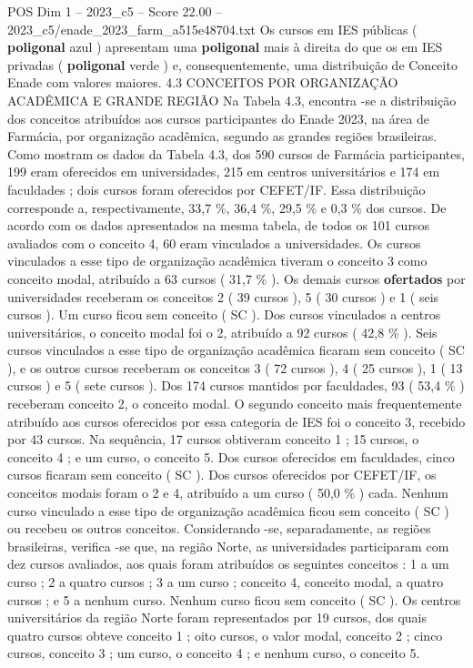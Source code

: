 \begin{textsample}{POS Dim 1 – 2023\_c5 – Score 22.00 – 2023\_c5/enade\_2023\_farm\_a515e48704.txt}
Os cursos em IES públicas ( \textbf{poligonal} azul ) apresentam uma \textbf{poligonal} mais à direita do que os em IES privadas ( \textbf{poligonal} verde ) e, consequentemente, uma distribuição de Conceito Enade com valores maiores. 4.3 CONCEITOS POR ORGANIZAÇÃO ACADÊMICA E GRANDE REGIÃO Na Tabela 4.3, encontra -se a distribuição dos conceitos atribuídos aos cursos participantes do Enade 2023, na área de Farmácia, por organização acadêmica, segundo as grandes regiões brasileiras.
Como mostram os dados da Tabela 4.3, dos 590 cursos de Farmácia participantes, 199 eram oferecidos em universidades, 215 em centros universitários e 174 em faculdades ; dois cursos foram oferecidos por CEFET/IF.
Essa distribuição corresponde a, respectivamente, 33,7 \%, 36,4 \%, 29,5 \% e 0,3 \% dos cursos.
De acordo com os dados apresentados na mesma tabela, de todos os 101 cursos avaliados com o conceito 4, 60 eram vinculados a universidades.
Os cursos vinculados a esse tipo de organização acadêmica tiveram o conceito 3 como conceito modal, atribuído a 63 cursos ( 31,7 \% ).
Os demais cursos \textbf{ofertados} por universidades receberam os conceitos 2 ( 39 cursos ), 5 ( 30 cursos ) e 1 ( seis cursos ).
Um curso ficou sem conceito ( SC ).
Dos cursos vinculados a centros universitários, o conceito modal foi o 2, atribuído a 92 cursos ( 42,8 \% ).
Seis cursos vinculados a esse tipo de organização acadêmica ficaram sem conceito ( SC ), e os outros cursos receberam os conceitos 3 ( 72 cursos ), 4 ( 25 cursos ), 1 ( 13 cursos ) e 5 ( sete cursos ).
Dos 174 cursos mantidos por faculdades, 93 ( 53,4 \% ) receberam conceito 2, o conceito modal.
O segundo conceito mais frequentemente atribuído aos cursos oferecidos por essa categoria de IES foi o conceito 3, recebido por 43 cursos.
Na sequência, 17 cursos obtiveram conceito 1 ; 15 cursos, o conceito 4 ; e um curso, o conceito 5.
Dos cursos oferecidos em faculdades, cinco cursos ficaram sem conceito ( SC ).
Dos cursos oferecidos por CEFET/IF, os conceitos modais foram o 2 e 4, atribuído a um curso ( 50,0 \% ) cada.
Nenhum curso vinculado a esse tipo de organização acadêmica ficou sem conceito ( SC ) ou recebeu os outros conceitos.
Considerando -se, separadamente, as regiões brasileiras, verifica -se que, na região Norte, as universidades participaram com dez cursos avaliados, aos quais foram atribuídos os seguintes conceitos : 1 a um curso ; 2 a quatro cursos ; 3 a um curso ; conceito 4, conceito modal, a quatro cursos ; e 5 a nenhum curso.
Nenhum curso ficou sem conceito ( SC ).
Os centros universitários da região Norte foram representados por 19 cursos, dos quais quatro cursos obteve conceito 1 ; oito cursos, o valor modal, conceito 2 ; cinco cursos, conceito 3 ; um curso, o conceito 4 ; e nenhum curso, o conceito 5.

\end{textsample}
